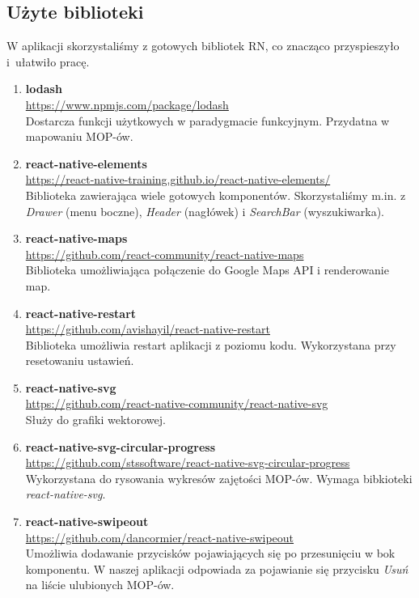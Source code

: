 \subsection{Użyte biblioteki}
W aplikacji skorzystaliśmy z gotowych bibliotek RN, co znacząco przyspieszyło i~ułatwiło pracę.
\begin{enumerate}
\item \textbf{lodash} \\
\url{https://www.npmjs.com/package/lodash}\\
Dostarcza funkcji użytkowych w paradygmacie funkcyjnym. Przydatna w mapowaniu MOP-ów.

\item \textbf{react-native-elements}\\
\url{https://react-native-training.github.io/react-native-elements/}\\ 
Biblioteka zawierająca wiele gotowych komponentów. Skorzystaliśmy m.in. z \textit{Drawer} (menu boczne), \textit{Header} (nagłówek) i \textit{SearchBar} (wyszukiwarka).

\item \textbf{react-native-maps} \\
\url{https://github.com/react-community/react-native-maps}\\
Biblioteka umożliwiająca połączenie do Google Maps API i renderowanie map.

\item \textbf{react-native-restart} \\
\url{https://github.com/avishayil/react-native-restart}\\
Biblioteka umożliwia restart aplikacji z poziomu kodu. Wykorzystana przy resetowaniu ustawień.

\item \textbf{react-native-svg} \\
\url{https://github.com/react-native-community/react-native-svg}\\
Służy do grafiki wektorowej.

\item \textbf{react-native-svg-circular-progress} \\
\url{https://github.com/stssoftware/react-native-svg-circular-progress}\\
Wykorzystana do rysowania wykresów zajętości MOP-ów. Wymaga bibkioteki \textit{react-native-svg}.

\item \textbf{react-native-swipeout} \\
\url{https://github.com/dancormier/react-native-swipeout}\\
Umożliwia dodawanie przycisków pojawiających się po przesunięciu w bok komponentu. W naszej aplikacji odpowiada za pojawianie się przycisku \textit{Usuń} na liście ulubionych MOP-ów.


\end{enumerate}

